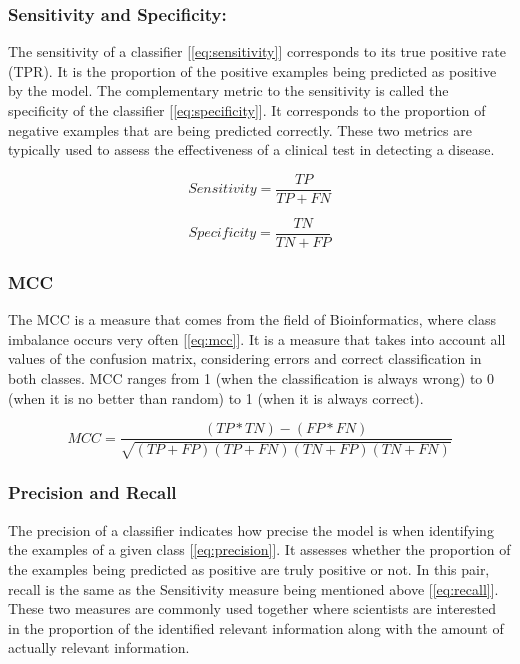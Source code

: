 \subsubsection{Sensitivity and Specificity:}

The sensitivity of a classifier [\ref{eq:sensitivity}] corresponds to its true positive rate (TPR). 
It is the proportion of the positive examples being predicted as positive by the model. 
The complementary metric to the sensitivity is called the specificity of the classifier 
[\ref{eq:specificity}]. It corresponds to the proportion of negative examples that are being 
predicted correctly. These two metrics are typically used to assess the effectiveness of 
a clinical test in detecting a disease.

\begin{equation}
    Sensitivity = \frac{TP}{TP+FN} 
    \label{eq:sensitivity}
\end{equation}

\begin{equation}
    Specificity = \frac{TN}{TN+FP} 
    \label{eq:specificity}
\end{equation}

\subsubsection{MCC}
The MCC \cite{matthews1975comparison} is a measure that comes from the field of Bioinformatics, 
where class imbalance occurs very often [\ref{eq:mcc}]. It is a measure that takes into account 
all values of the confusion matrix, considering errors and correct classification in both classes. 
MCC ranges from 1 (when the classification is always wrong) to 0 (when it is no better than random) 
to 1 (when it is always correct).

\begin{equation}
    MCC = \frac{(TP*TN)-(FP*FN)}{\sqrt{(TP+FP)(TP+FN)(TN+FP)(TN+FN)}}
    \label{eq:mcc}
\end{equation}

\subsubsection{Precision and Recall}

The precision of a classifier indicates how precise the model is when identifying the examples 
of a given class [\ref{eq:precision}]. It assesses whether the proportion of the examples being predicted 
as positive are truly positive or not. In this pair, recall is the same as the Sensitivity measure 
being mentioned above [\ref{eq:recall}]. These two measures are commonly used together where scientists 
are interested in the proportion of the identified relevant information along with the amount of 
actually relevant information.

